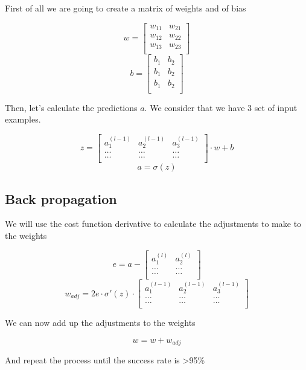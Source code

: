 \documentclass[]{report}
\begin{document}
{First of all we are going to create a matrix of weights and of bias}

\[w=\begin{bmatrix}
w_{11} & w_{21} \\
w_{12} & w_{22} \\
w_{13} & w_{23} \\
\end{bmatrix}\]
\[b=\begin{bmatrix}
b_{1} & b_{2} \\
b_{1} & b_{2} \\
b_{1} & b_{2} \\
\end{bmatrix}\]

{Then, let's calculate the predictions $a$. We consider that we have 3 set of input examples.}

\[z=\begin{bmatrix}
a^{(l-1)}_1 & a^{(l-1)}_2 & a^{(l-1)}_3 \\
\ldots & \ldots & \ldots \\
\ldots & \ldots & \ldots \\
\end{bmatrix}\cdot w+b\]
\[a=\sigma (z)\]

\subsection{Back propagation}

{We will use the cost function derivative to calculate the adjustments to make to the weights}

\[e=a-\begin{bmatrix}
a^{(l)}_1 & a^{(l)}_2 \\
\ldots & \ldots \\
\ldots & \ldots \\
\end{bmatrix}\]
\[w_{adj}=2e \cdot \sigma\prime (z)\cdot
\begin{bmatrix}
a^{(l-1)}_1 & a^{(l-1)}_2 & a^{(l-1)}_3 \\
\ldots & \ldots & \ldots \\
\ldots & \ldots & \ldots \\
\end{bmatrix}\]

{We can now add up the adjustments to the weights}

\[w=w+w_{adj}\]

{And repeat the process until the success rate is >95\%}
\end{document}
